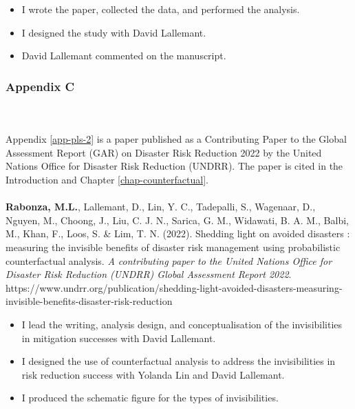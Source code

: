{\begin{itemize}
    \setlength\itemsep{-0.45em}
    \item I wrote the paper, collected the data, and performed the analysis.
    \item I designed the study with David Lallemant.
    \item David Lallemant commented on the manuscript.
    \end{itemize}


\vspace{.2cm}
\subsubsection*{Appendix C}

\\ \\ 
\noindent
Appendix \ref{app-pls-2} is a paper published as a Contributing Paper to the Global Assessment Report (GAR) on Disaster Risk Reduction 2022 by the United Nations Office for Disaster Risk Reduction (UNDRR). The paper is cited in the Introduction and Chapter \ref{chap-counterfactual}.
\\ \\
    \textbf{Rabonza, M.L.}, Lallemant,  D.,  Lin,  Y. C., Tadepalli,  S., Wagenaar,  D., Nguyen,  M., Choong,  J., Liu,  C. J. N., Sarica,  G. M., Widawati,  B. A. M., Balbi,  M., Khan,  F., Loos,  S. \& Lim,  T. N. (2022). Shedding light on avoided disasters : measuring the invisible benefits of disaster risk management using probabilistic counterfactual analysis. \textit{A contributing paper to the United Nations Office for Disaster Risk Reduction (UNDRR) Global Assessment Report 2022}. https://www.undrr.org/publication/shedding-light-avoided-disasters-measuring-invisible-benefits-disaster-risk-reduction
    \begin{itemize}
    \setlength\itemsep{-0.5em}
    \item I lead the writing, analysis design, and conceptualisation of the invisibilities in mitigation successes with David Lallemant.
    \item I designed the use of counterfactual analysis to address the invisibilities in risk reduction success with Yolanda Lin and David Lallemant.
    \item I produced the schematic figure for the types of invisibilities.

\end{itemize}}
